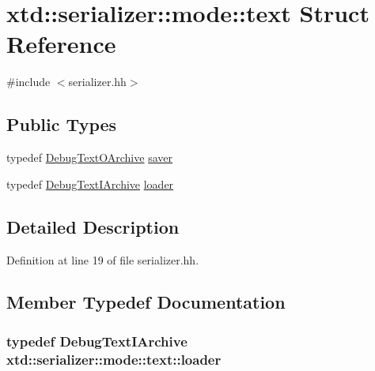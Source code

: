 \hypertarget{structxtd_1_1serializer_1_1mode_1_1text}{\section{xtd\-:\-:serializer\-:\-:mode\-:\-:text Struct Reference}
\label{structxtd_1_1serializer_1_1mode_1_1text}
}


{\ttfamily \#include $<$serializer.\-hh$>$}

\subsection*{Public Types}
\begin{DoxyCompactItemize}
\item 
typedef \hyperlink{classxtd_1_1serializer_1_1DebugTextOArchive}{Debug\-Text\-O\-Archive} \hyperlink{structxtd_1_1serializer_1_1mode_1_1text_a8be416039df8bbed799423bb996811a8}{saver}
\item 
typedef \hyperlink{classxtd_1_1serializer_1_1DebugTextIArchive}{Debug\-Text\-I\-Archive} \hyperlink{structxtd_1_1serializer_1_1mode_1_1text_ad178828d538da6465ca47886a70ac664}{loader}
\end{DoxyCompactItemize}


\subsection{Detailed Description}


Definition at line 19 of file serializer.\-hh.



\subsection{Member Typedef Documentation}
\hypertarget{structxtd_1_1serializer_1_1mode_1_1text_ad178828d538da6465ca47886a70ac664}{
\subsubsection[{loader}]{\setlength{\rightskip}{0pt plus 5cm}typedef {\bf Debug\-Text\-I\-Archive} {\bf xtd\-::serializer\-::mode\-::text\-::loader}}}\label{structxtd_1_1serializer_1_1mode_1_1text_ad178828d538da6465ca47886a70ac664}


